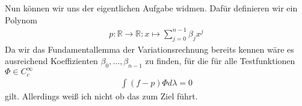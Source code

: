 \begin{solution}
    Nun können wir uns der eigentlichen Aufgabe widmen. Dafür definieren wir ein Polynom 
    \begin{align*}
        p:\mathbb{R}\to\mathbb{R}:x\mapsto\sum_{j=0}^{n-1}\beta_jx^j
    \end{align*}
    Da wir das Fundamentallemma der Variationsrechnung bereits kennen wäre es ausreichend Koeffizienten $\beta_0,\dots,\beta_{n-1}$ zu finden, für die für alle Testfunktionen $\Phi\in C_c^\infty$
    \begin{align*}
        \int (f-p)\Phi d\lambda=0
    \end{align*}
    gilt. Allerdings weiß ich nicht ob das zum Ziel führt.
\end{solution}
